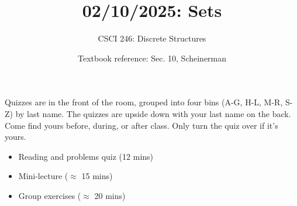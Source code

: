 \documentclass[10pt]{beamer}
\begin{document}






\title{02/10/2025: Sets}
\author{CSCI 246: Discrete Structures}
\date{Textbook reference: Sec. 10, Scheinerman}

\begin{frame}
    \titlepage 
\end{frame}


\begin{frame}
\footnotesize 
\begin{mygreenbox}[title=Graded Quiz Pickup]
Quizzes are in the front of the room, grouped into four bins (A-G, H-L, M-R, S-Z) by last name. The quizzes are upside down with your last name on the back. Come find yours before, during, or after class.  Only turn the quiz over if it's yours.
\end{mygreenbox} 
\vfill 

%
%
%


\begin{myyellowbox}[title=Today's Agenda]
\begin{itemize}
	\item Reading and problems quiz  (12 mins)
	\item Mini-lecture ($\approx$ 15 mins)
	\item Group exercises ($\approx$ 20 mins)
\end{itemize}

\end{myyellowbox}
\vfill 

\end{frame}
\end{document}
